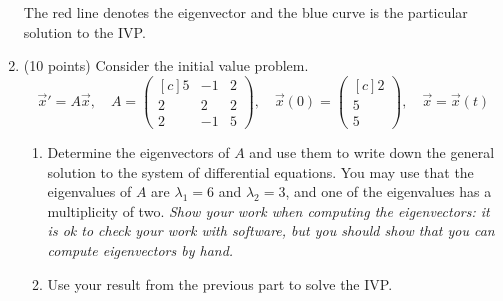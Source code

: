 \documentclass[11pt, titlepage]{article}
\begin{document}
\begin{enumerate}
\begin{solution}
      The red line denotes the eigenvector and the blue curve is the particular solution to the IVP.
    \end{solution}

    \pagebreak

    \item (10 points) Consider the initial value problem.
    \begin{equation*}
      \vec{x}' = A \vec{x}, \quad A =
      \begin{pmatrix*}[c]
        5 & -1 & 2 \\
        2 &  2 & 2 \\
        2 & -1 & 5
      \end{pmatrix*}, \quad \vec{x}(0) =
      \begin{pmatrix*}[c]
        2 \\
        5 \\
        5
      \end{pmatrix*}, \quad \vec{x} = \vec{x}(t)
    \end{equation*}

    \begin{enumerate}[label={(\alph*)}]
      \item Determine the eigenvectors of \(A\) and use them to write down the general solution to the system of differential equations.
      You may use that the eigenvalues of \(A\) are \(\lambda_{1} = 6\) and \(\lambda_{2} = 3\), and one of the eigenvalues has a multiplicity of two.
      \textit{Show your work when computing the eigenvectors:
      it is ok to check your work with software, but you should show that you can compute eigenvectors by hand.}

      \item Use your result from the previous part to solve the IVP.
    \end{enumerate}


\end{enumerate}
\end{document}
